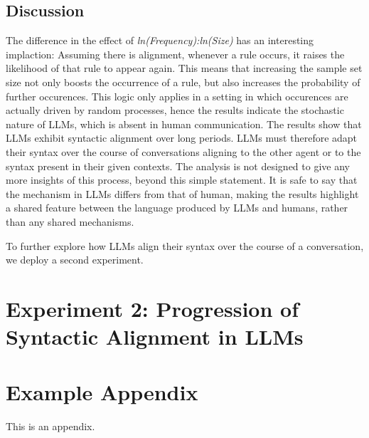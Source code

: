 \documentclass[11pt]{article}
\begin{document}
\subsection{Discussion}


The difference in the effect of \textit{ln(Frequency):ln(Size)} has an interesting implaction: Assuming there is alignment, whenever a rule occurs, it raises the likelihood of that rule to appear again. This means that increasing the sample set size not only boosts the occurrence of a rule, but also increases the probability of further occurences. This logic only applies in a setting in which occurences are actually driven by random processes, hence the results indicate the stochastic nature of LLMs, which is absent in human communication.
The results show that LLMs exhibit syntactic alignment over long periods.
LLMs must therefore adapt their syntax over the course of conversations aligning to the other agent or to the syntax present in their given contexts. The analysis is not designed to give any more insights of this process, beyond this simple statement. It is safe to say that the mechanism in LLMs differs from that of human, making the results highlight a shared feature between the language produced by LLMs and humans, rather than any shared mechanisms.

To further explore how LLMs align their syntax over the course of a conversation, we deploy a second experiment.

\section{Experiment 2: Progression of Syntactic Alignment in LLMs}
%


\appendix

\section{Example Appendix}
\label{sec:appendix}

This is an appendix.
\end{document}
